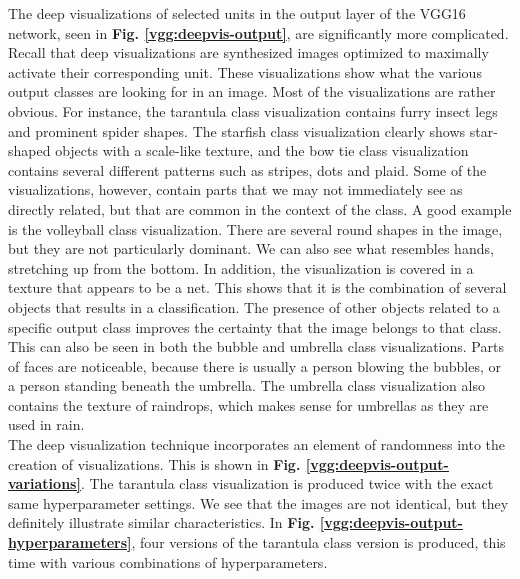 
\noindent The deep visualizations of selected units in the output layer of the VGG16 network, seen in \textbf{Fig. \ref{vgg:deepvis-output}}, are significantly more complicated. Recall that deep visualizations are synthesized images optimized to maximally activate their corresponding unit. These visualizations show what the various output classes are looking for in an image. Most of the visualizations are rather obvious. For instance, the tarantula class visualization contains furry insect legs and prominent spider shapes. The starfish class visualization clearly shows star-shaped objects with a scale-like texture, and the bow tie class visualization contains several different patterns such as stripes, dots and plaid. Some of the visualizations, however, contain parts that we may not immediately see as directly related, but that are common in the context of the class. A good example is the volleyball class visualization. There are several round shapes in the image, but they are not particularly dominant. We can also see what resembles hands, stretching up from the bottom. In addition, the visualization is covered in a texture that appears to be a net. This shows that it is the combination of several objects that results in a classification. The presence of other objects related to a specific output class improves the certainty that the image belongs to that class. This can also be seen in both the bubble and umbrella class visualizations. Parts of faces are noticeable, because there is usually a person blowing the bubbles, or a person standing beneath the umbrella. The umbrella class visualization also contains the texture of raindrops, which makes sense for umbrellas as they are used in rain. \\

\noindent The deep visualization technique incorporates an element of randomness into the creation of visualizations. This is shown in \textbf{Fig. \ref{vgg:deepvis-output-variations}}. The tarantula class visualization is produced twice with the exact same hyperparameter settings. We see that the images are not identical, but they definitely illustrate similar characteristics. In \textbf{Fig. \ref{vgg:deepvis-output-hyperparameters}}, four versions of the tarantula class version is produced, this time with various combinations of hyperparameters. \\ %

